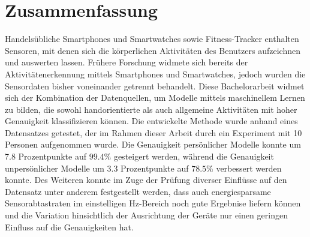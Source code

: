 \chapter*{Zusammenfassung}
Handelsübliche Smartphones und Smartwatches sowie Fitness-Tracker enthalten Sensoren, mit denen sich die körperlichen Aktivitäten des Benutzers aufzeichnen und auswerten lassen. Frühere Forschung widmete sich bereits der Aktivitätenerkennung mittels Smartphones und Smartwatches, jedoch wurden die Sensordaten bisher voneinander getrennt behandelt. Diese Bachelorarbeit widmet sich der Kombination der Datenquellen, um Modelle mittels maschinellem Lernen zu bilden, die sowohl handorientierte als auch allgemeine Aktivitäten mit hoher Genauigkeit klassifizieren können. Die entwickelte Methode wurde anhand eines Datensatzes getestet, der im Rahmen dieser Arbeit durch ein Experiment mit 10 Personen aufgenommen wurde. Die Genauigkeit persönlicher Modelle konnte um 7.8 Prozentpunkte auf $99.4 \%$ gesteigert werden, während die Genauigkeit unpersönlicher Modelle um 3.3 Prozentpunkte auf $78.5 \%$ verbessert werden konnte. Des Weiteren konnte im Zuge der Prüfung diverser Einflüsse auf den Datensatz unter anderem festgestellt werden, dass auch energiesparsame Sensorabtastraten im einstelligen Hz-Bereich noch gute Ergebnise liefern können und die Variation hinsichtlich der Ausrichtung der Geräte nur einen geringen Einfluss auf die Genauigkeiten hat.

